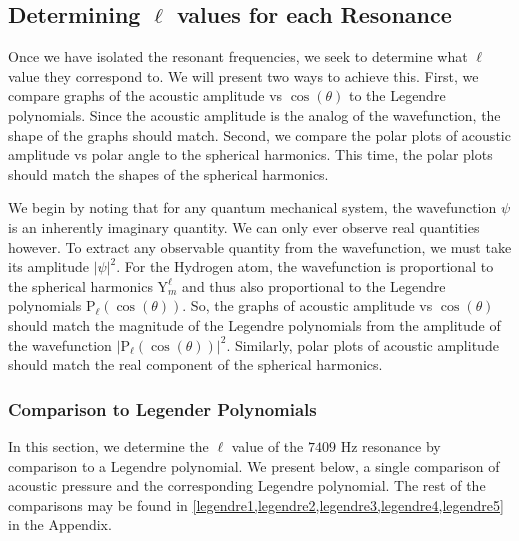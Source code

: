 \documentclass[12pt]{article}
\newcommand{\Ylm}[2]{\mathrm{Y}^{#1}_{#2}} %
\begin{document}
		
	
	\subsection{Determining $\ell$ values for each Resonance}
	Once we have isolated the resonant frequencies, we seek to determine what $\ell$ value they correspond to. We will present two ways to achieve this. First, we compare graphs of the acoustic amplitude vs $\cos(\theta)$ to the Legendre polynomials. Since the acoustic amplitude is the analog of the wavefunction, the shape of the graphs should match. Second, we compare the polar plots of acoustic amplitude vs polar angle to the spherical harmonics. This time, the polar plots should match the shapes of the spherical harmonics.
	
	We begin by noting that for any quantum mechanical system, the wavefunction $\psi$ is an inherently imaginary quantity. We can only ever observe real quantities however. To extract any observable quantity from the wavefunction, we must take its amplitude $|\psi|^2$. For the Hydrogen atom, the wavefunction is proportional to the spherical harmonics $\Ylm{\ell}{m}$ and thus also proportional to the Legendre polynomials $\mathrm{P}_\ell(\cos(\theta))$. So, the graphs of acoustic amplitude vs $\cos(\theta)$ should match the magnitude of the Legendre polynomials from the amplitude of the wavefunction $|\mathrm{P}_\ell(\cos(\theta))|^2$. Similarly, polar plots of acoustic amplitude should match the real component of the spherical harmonics.
	

	\subsubsection{Comparison to Legender Polynomials}
	In this section, we determine the $\ell$ value of the $7409$ Hz resonance by comparison to a Legendre polynomial. We present below, a single comparison of acoustic pressure and the corresponding Legendre polynomial. The rest of the comparisons may be found in \cref{legendre1,legendre2,legendre3,legendre4,legendre5} in the Appendix.
	
\end{document}
